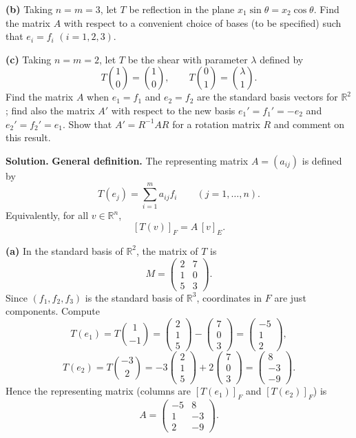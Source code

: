\documentclass[12pt,a4paper]{article}
\theoremstyle{plain}
\theoremstyle{definition}      %
\begin{document}
\textbf{(b)} Taking $n=m=3$, let $T$ be reflection in the plane $x_1\sin\theta=x_2\cos\theta$.
Find the matrix $A$ with respect to a convenient choice of bases (to be specified) such that $e_i=f_i$ $(i=1,2,3)$.

\textbf{(c)} Taking $n=m=2$, let $T$ be the shear with parameter $\lambda$ defined by
\[
T\binom10=\binom10,\qquad T\binom01=\binom{\lambda}{1}.
\]
Find the matrix $A$ when $e_1=f_1$ and $e_2=f_2$ are the standard basis vectors for $\mathbb R^2$; find also the matrix $A'$
with respect to the new basis $e_1'=f_1'=-e_2$ and $e_2'=f_2'=e_1$.
Show that $A'=R^{-1}AR$ for a rotation matrix $R$ and comment on this result.

\textbf{Solution.}
\textbf{General definition.} The representing matrix $A=(a_{ij})$ is defined by
\[
T(e_j)=\sum_{i=1}^m a_{ij} f_i\qquad (j=1,\dots,n).
\]
Equivalently, for all $v\in\mathbb R^n$,
\[
[T(v)]_F = A\,[v]_E.
\]

\textbf{(a)} In the standard basis of $\mathbb R^2$, the matrix of $T$ is
\[
M=\begin{pmatrix}2&7\\1&0\\5&3\end{pmatrix}.
\]
Since $(f_1,f_2,f_3)$ is the standard basis of $\mathbb R^3$, coordinates in $F$ are just components. Compute
\[
T(e_1)=T\binom{1}{-1}
=\begin{pmatrix}2\\1\\5\end{pmatrix}-\begin{pmatrix}7\\0\\3\end{pmatrix}
=\begin{pmatrix}-5\\1\\2\end{pmatrix},
\]
\[
T(e_2)=T\binom{-3}{2}
=-3\begin{pmatrix}2\\1\\5\end{pmatrix}+2\begin{pmatrix}7\\0\\3\end{pmatrix}
=\begin{pmatrix}8\\-3\\-9\end{pmatrix}.
\]
Hence the representing matrix (columns are $[T(e_1)]_F$ and $[T(e_2)]_F$) is
\[
\boxed{
	A=\begin{pmatrix}
		-5&8\\
		1&-3\\
		2&-9
	\end{pmatrix}.}
\]
\end{document}
